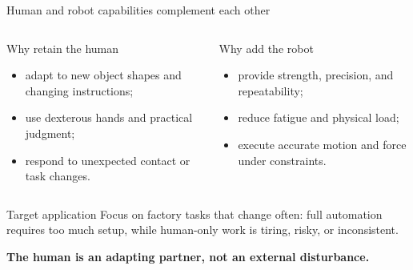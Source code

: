 \documentclass[aspectratio=169,11pt]{beamer}
\begin{document}
\begin{frame}{Human and robot capabilities complement each other}
\begin{columns}[T,onlytextwidth]
\begin{block}{Why retain the human}
\begin{itemize}
  \item adapt to new object shapes and changing instructions;
  \item use dexterous hands and practical judgment;
  \item respond to unexpected contact or task changes.
\end{itemize}
\end{block}
\begin{block}{Why add the robot}
\begin{itemize}
  \item provide strength, precision, and repeatability;
  \item reduce fatigue and physical load;
  \item execute accurate motion and force under constraints.
\end{itemize}
\end{block}
\end{columns}
\vspace{0.28cm}
\begin{alertblock}{Target application}
Focus on factory tasks that change often: full automation requires too much setup, while human-only work is tiring, risky, or inconsistent.
\end{alertblock}
\vspace{0.12cm}
\centering\textbf{The human is an adapting partner, not an external disturbance.}
\end{frame}
\end{document}
